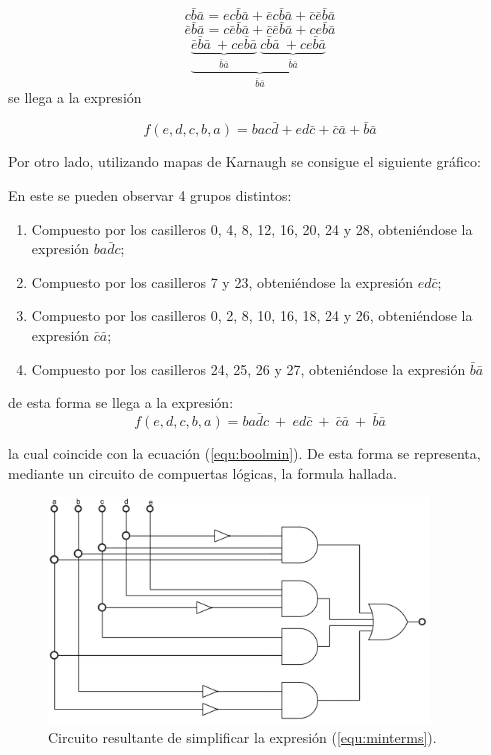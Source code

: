\documentclass[a4paper]{article}
\begin{document}
\begin{center}
\[
		c\bar{b}\bar{a}= ec\bar{b}\bar{a}+\bar{e}c\bar{b}\bar{a}+\bar{c}\bar{e}\bar{b}\bar{a}
\]
\[
		\bar{e}\bar{b}\bar{a}=c\bar{e}\bar{b}\bar{a}+\bar{c}\bar{e}\bar{b}\bar{a}+ce\bar{b}\bar{a}
\]
\[
	\underbrace{\underbrace{\bar{e}\bar{b}\bar{a} \ + ce\bar{b}\bar{a}  }_{ \bar{b}\bar{a}}\ 
	\underbrace{c\bar{b}\bar{a} \ + ce\bar{b}\bar{a}  }_{ \bar{b}\bar{a}}\ }_{\bar{b}\bar{a}}
\]
se llega a la expresión

\begin{equation}
		f \left( e,d,c,b,a \right) =bac\bar{d}+ed\bar{c}+\bar{c}\bar{a}+\bar{b}\bar{a}
		\label{equ:boolmin}
\end{equation}
\end{center}

Por otro lado, utilizando mapas de Karnaugh se consigue el siguiente gráfico:



En este se pueden observar 4 grupos distintos:
\begin{enumerate}
	\item Compuesto por los casilleros 0, 4, 8, 12, 16, 20, 24 y 28, obteniéndose la expresión $ b a \bar{d} c $;
	\item Compuesto por los casilleros 7 y 23, obteniéndose la expresión $ e d \bar{c} $;
	\item Compuesto por los casilleros 0, 2, 8, 10, 16, 18, 24 y 26, obteniéndose la expresión $ \bar{c} \bar{a} $;
	\item Compuesto por los casilleros 24, 25, 26 y 27, obteniéndose la expresión $ \bar{b} \bar{a} $
\end{enumerate}

de esta forma se llega a la expresión:
\[
	f \left( e,d,c,b,a \right) = b a \bar{d} c \ + \  e d \bar{c} \ + \ \bar{c} \bar{a} \ + \ \bar{b} \bar{a}
\]

la cual coincide con la ecuación (\ref{equ:boolmin}). De esta forma se representa, mediante un circuito de compuertas lógicas, la formula hallada.

\begin{figure}[H]
	\centering
	\includegraphics[width=0.9\textwidth]{Circuito1.PNG}
\caption{Circuito resultante de simplificar la expresión (\ref{equ:minterms}).}
	\label{fig:circ1}
\end{figure}
\end{document}
